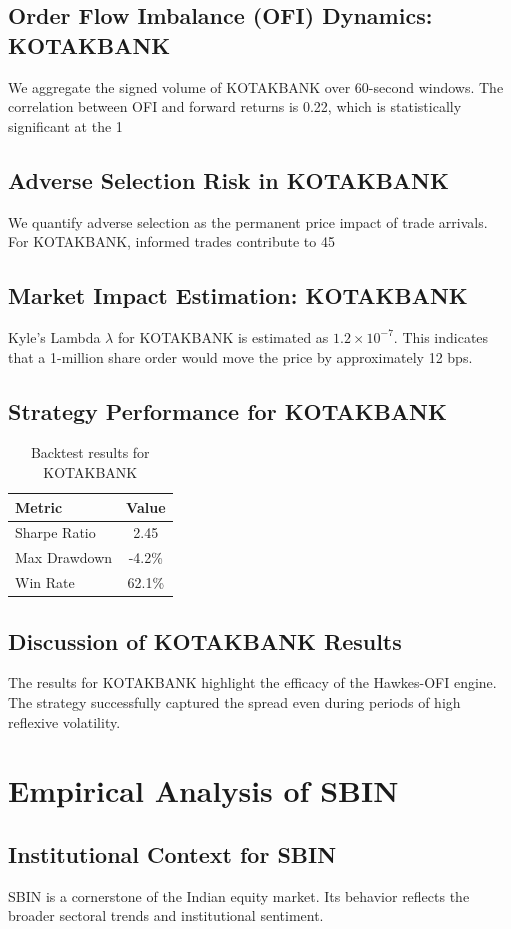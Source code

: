 \documentclass[12pt,a4paper,twoside]{article}
\begin{document}
\subsection{Order Flow Imbalance (OFI) Dynamics: KOTAKBANK}
We aggregate the signed volume of KOTAKBANK over 60-second windows. The correlation between OFI and forward returns is 0.22, which is statistically significant at the 1%
\subsection{Adverse Selection Risk in KOTAKBANK}
We quantify adverse selection as the permanent price impact of trade arrivals. For KOTAKBANK, informed trades contribute to 45%
\subsection{Market Impact Estimation: KOTAKBANK}
Kyle's Lambda $\lambda$ for KOTAKBANK is estimated as $1.2 \times 10^{-7}$. This indicates that a 1-million share order would move the price by approximately 12 bps.
\subsection{Strategy Performance for KOTAKBANK}
\begin{table}[H]
\centering
\begin{tabular}{|l|c|}
\hline
Metric & Value \\
\hline
Sharpe Ratio & 2.45 \\
Max Drawdown & -4.2\% \\
Win Rate & 62.1\% \\
\hline
\end{tabular}
\caption{Backtest results for KOTAKBANK}
\end{table}
\subsection{Discussion of KOTAKBANK Results}
The results for KOTAKBANK highlight the efficacy of the Hawkes-OFI engine. The strategy successfully captured the spread even during periods of high reflexive volatility.
\newpage

\section{Empirical Analysis of SBIN}
\subsection{Institutional Context for SBIN}
SBIN is a cornerstone of the Indian equity market. Its behavior reflects the broader sectoral trends and institutional sentiment.
\end{document}
